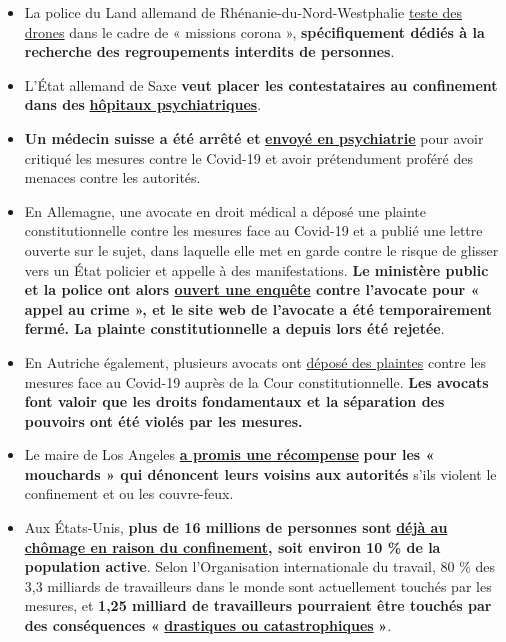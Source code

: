 \begin{itemize}
{  la police pour faire respecter leurs ordres} ».
\item
  La police du Land allemand de Rhénanie-du-Nord-Westphalie
  \href{https://rp-online.de/nrw/panorama/nrw-polizei-testet-drohnen-bei-einsaetzen-wegen-corona-massnahmen_aid-50006143}{teste
  des drones} dans le cadre de « missions corona »,
  \textbf{spécifiquement dédiés à la recherche des regroupements
  interdits de personnes}.
\item
  L'État allemand de Saxe \textbf{veut placer les contestataires au
  confinement dans des}
  \href{https://www.welt.de/politik/deutschland/article207198029/Coronavirus-Sachsen-will-Quarantaene-Verweigerer-in-Psychiatrien-sperren.html}{\textbf{hôpitaux
  psychiatriques}}.
\item
  \textbf{Un médecin suisse a été arrêté et}
  \href{https://www.blick.ch/news/schweiz/mittelland/in-baden-ag-polizei-in-vollmontur-im-einsatz-id15841510.html}{\textbf{envoyé
  en psychiatrie}} pour avoir critiqué les mesures contre le Covid-19 et
  avoir prétendument proféré des menaces contre les autorités.
\item
  En Allemagne, une avocate en droit médical a déposé une plainte
  constitutionnelle contre les mesures face au Covid-19 et a publié une
  lettre ouverte sur le sujet, dans laquelle elle met en garde contre le
  risque de glisser vers un État policier et appelle à des
  manifestations. \textbf{Le ministère public et la police ont alors
  \href{https://www.morgenweb.de/mannheimer-morgen_artikel,-coronavirus-aufruf-zu-straftaten-ermittlungen-gegen-heidelberger-rechtsanwaeltin-_arid,1627078.html}{ouvert
  une enquête} contre l'avocate pour « appel au crime », et le site web
  de l'avocate a été temporairement fermé. La plainte constitutionnelle
  a depuis lors été rejetée}.
\item
  En Autriche également, plusieurs avocats ont
  \href{https://wien.orf.at/stories/3043172/}{déposé des plaintes}
  contre les mesures face au Covid-19 auprès de la Cour
  constitutionnelle. \textbf{Les avocats font valoir que les droits
  fondamentaux et la séparation des pouvoirs ont été violés par les
  mesures.}
\item
  Le maire de Los Angeles
  \href{https://townhall.com/tipsheet/bethbaumann/2020/04/04/la-mayor-garcetti-says-snitches-get-rewards-for-ratting-out-their-neighbors-n2566348}{\textbf{a
  promis une récompense}} \textbf{pour les « mouchards » qui dénoncent
  leurs voisins aux autorités} s'ils violent le confinement et ou les
  couvre-feux.
\item
  Aux États-Unis, \textbf{plus de 16 millions de personnes sont}
  \href{https://www.nytimes.com/2020/04/09/us/coronavirus-us-news.html}{\textbf{déjà
  au chômage en raison du confinement}}\textbf{, soit environ 10 \% de
  la population active}. Selon l'Organisation internationale du travail,
  80 \% des 3,3 milliards de travailleurs dans le monde sont
  actuellement touchés par les mesures, et \textbf{1,25 milliard de
  travailleurs pourraient être touchés par des conséquences «}
  \href{https://www.ilo.org/global/about-the-ilo/newsroom/news/WCMS_740893/lang--en/index.htm}{\textbf{drastiques
  ou catastrophiques}} \textbf{»}.
\end{itemize}

